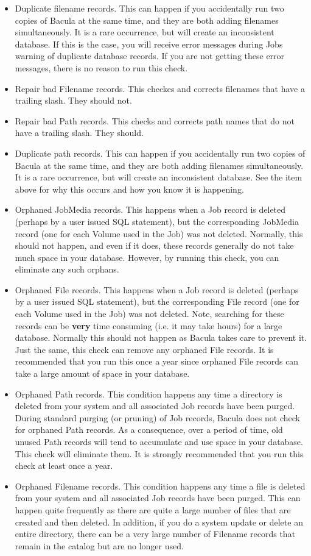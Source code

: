 \begin{itemize}
\item Duplicate filename records. This can happen if you accidentally run  two
   copies of Bacula at the same time, and they are both adding  filenames
   simultaneously. It is a rare occurrence, but will create  an inconsistent
database. If this is the case, you will receive  error messages during Jobs
warning of duplicate database records.  If you are not getting these error
messages, there is no reason  to run this check. 
\item Repair bad Filename records. This checkes and corrects filenames  that
   have a trailing slash. They should not.  
\item Repair bad Path records. This checks and corrects path names  that do
   not have a trailing slash. They should.  
\item Duplicate path records. This can happen if you accidentally run  two
   copies of Bacula at the same time, and they are both adding  filenames
   simultaneously. It is a rare occurrence, but will create  an inconsistent
database. See the item above for why this occurs and  how you know it is
happening. 
\item Orphaned JobMedia records. This happens when a Job record is deleted 
   (perhaps by a user issued SQL statement), but the corresponding  JobMedia
   record (one for each Volume used in the Job) was not deleted.  Normally, this
should not happen, and even if it does, these records  generally do not take
much space in your database. However, by running  this check, you can
eliminate any such orphans.  
\item Orphaned File records. This happens when a Job record is deleted 
   (perhaps by a user issued SQL statement), but the corresponding  File record
   (one for each Volume used in the Job) was not deleted.  Note, searching for
these records can be {\bf very} time consuming (i.e.  it may take hours) for a
large database. Normally this should not  happen as Bacula takes care to
prevent it. Just the same, this  check can remove any orphaned File records.
It is recommended that  you run this once a year since orphaned File records
can take a  large amount of space in your database. 
\item Orphaned Path records. This condition happens any time a directory is 
   deleted from your system and all associated Job records have been purged. 
   During standard purging (or pruning) of Job records, Bacula does  not check
for orphaned Path records. As a consequence, over a period  of time, old
unused Path records will tend to accumulate and use  space in your database.
This check will eliminate them. It is strongly  recommended that you run this
check at least once a year. 
\item Orphaned Filename records. This condition happens any time a file is 
   deleted from your system and all associated Job records have been purged. 
   This can happen quite frequently as there are quite a large number  of files
that are created and then deleted. In addition, if you  do a system update or
delete an entire directory, there can be  a very large number of Filename
records that remain in the catalog  but are no longer used.  


\end{itemize}
